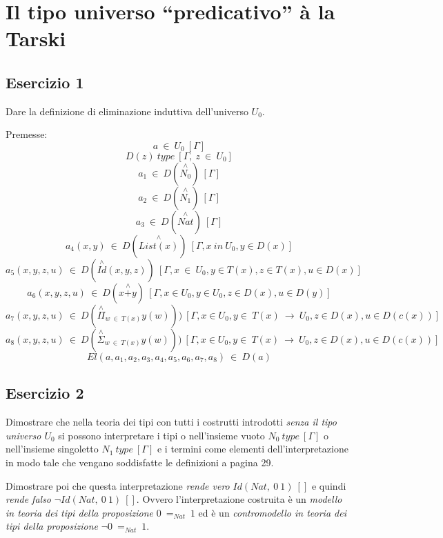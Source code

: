 \newpage
\section{Il tipo universo ``predicativo'' à la Tarski}
\subsection{Esercizio 1}
\begin{thm}
	Dare la definizione di eliminazione induttiva dell'universo $U_0$.
\end{thm}
Premesse:
\[a~\in~U_0~[\Gamma]\]
\[D(z)~type~[\Gamma,~z~\in~U_0]\]
\[a_1~\in~D(\stackrel{\wedge}{N_0})~[\Gamma]\]
\[a_2~\in~D(\stackrel{\wedge}{N_1})~[\Gamma]\]
\[a_3~\in~D(\stackrel{\wedge}{Nat})~[\Gamma]\]
\[a_4(x,y)~\in~D(\stackrel{\wedge}{List(x)})~[\Gamma,x~in~U_0,y\in D(x)]\]
\[a_5(x,y,z,u)~\in~D(\stackrel{\wedge}{Id}(x,y,z))~[\Gamma,x~\in~U_0,y\in T(x),z\in T(x), u\in D(x)]\]
\[a_6(x,y,z,u)~\in~D(x\stackrel{\wedge}{+}y)~[\Gamma,x\in U_0,y\in U_0,z\in D(x), u\in D(y)]\]
\[a_7(x,y,z,u)~\in~D(\stackrel{\wedge}{\Pi}_{w~\in~T(x)}y(w)))~[\Gamma,x\in U_0,y\in~T(x)~\to~U_0,z\in D(x), u\in D(c(x))]\]
\[a_8(x,y,z,u)~\in~D(\stackrel{\wedge}{\Sigma}_{w~\in~T(x)}y(w)))~[\Gamma,x\in U_0,y\in~T(x)~\to~U_0,z\in D(x), u\in D(c(x))]\]
\noindent\makebox[\linewidth]{\rule{\paperwidth}{0.4pt}}
\[El(a,a_1,a_2,a_3,a_4,a_5,a_6,a_7,a_8)~\in~D(a)\]

\subsection{Esercizio 2}
\begin{thm}
	Dimostrare che nella teoria dei tipi con tutti i costrutti introdotti \textit{senza il tipo universo $U_0$} si possono interpretare i tipi o nell'insieme vuoto $N_0~type~[\Gamma]$ o nell'insieme singoletto $N_1~type~[\Gamma]$ e i termini come elementi dell'interpretazione in modo tale che vengano soddisfatte le definizioni a pagina 29.
	
	Dimostrare poi che questa interpretazione \textit{rende vero} $Id(Nat,~0~1)~[]$ e quindi \textit{rende falso} $\neg Id(Nat,~0~1)~[]$. Ovvero l'interpretazione costruita è un \textit{modello in teoria dei tipi della proposizione} $0~=_{Nat}~1$ ed è un \textit{contromodello in teoria dei tipi della proposizione} $\neg 0~=_{Nat}~1$.
\end{thm}


